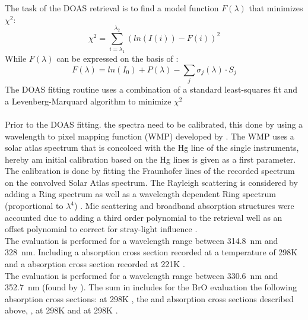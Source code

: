 \documentclass  [
  paper    = a4,
  BCOR     = 10mm,
  twoside,
  fontsize = 12pt,
  fleqn,
  toc      = bibnumbered,
  toc      = listofnumbered,
  numbers  = noendperiod,
  headings = normal,
  listof   = leveldown,
  version  = 3.03
]                                       {scrreprt}
\begin{document}
	The task of the DOAS retrieval is to find a model function $F \left(\lambda\right)$ that minimizes $\chi^2$:
	\begin{equation}
	\chi^2 = \sum_{i=\lambda_1}^{\lambda_2}\left(ln(I(i))-F(i)\right)^2
	\label{eq:Chi}
	\end{equation}
	While $F\left(\lambda\right)$ can be expressed on the basis of :
	\begin{equation}
	F\left(\lambda\right) = ln\left(I_0 \right) + P \left(\lambda\right)-
	\sum_{j}\sigma_j \left(\lambda\right) \cdot S_j
	\label{eq:F}
	\end{equation}
	The DOAS fitting routine uses a combination of a standard least-squares fit and a Levenberg-Marquard algorithm to minimize $\chi^2$\\
	\\
	Prior to the DOAS fitting. the spectra need to be calibrated, this done by using a wavelength to pixel mapping function (WMP) developed by \citet{lehmann2011improving}. The WMP uses a solar atlas spectrum that is concolced with the Hg line of the single instruments, hereby am initial calibration based on the Hg lines is given as a first parameter. The calibration is done by fitting the Fraunhofer lines of the recorded spectrum on the convolved Solar Atlas spectrum. The Rayleigh scattering is considered by adding a Ring spectrum as well as a wavelength dependent Ring spectrum (proportional to $\lambda^4$) \citep{wagner2009three}. Mie scattering and broadband absorption structures were accounted due to adding a third order polynomial to the retrieval well as an offset polynomial to correct for stray-light influence \citep{lubcke2014bro}.\\
	The  evaluation is performed for a wavelength range between 314.8~nm and 328~nm. Including a  absorption cross section recorded at a temperature of 298K \citep{vandaele2009fourier} and a   absorption cross section recorded at 221K \citep{burrows1999atmospheric}.\\
	The   evaluation is performed for a wavelength range between 330.6~nm and 352.7~nm (found by \citet{vogel2011volcanic}). The sum in  includes for the BrO evaluation the following absorption cross sections:
	  at 298K \citep{fleischmann2004new}, the  and   absorption cross sections described above,  \citep{hermans2003absorption},   at 298K \citep{vandaele1998measurements} and   at 298K \citep{meller2000temperature}.\\
\end{document}
